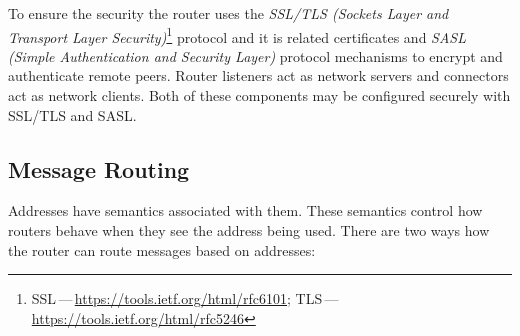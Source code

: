 
To ensure the security the router uses the \emph{SSL/TLS (Sockets Layer and Transport Layer Security)}\footnote{SSL\,---\,\url{https://tools.ietf.org/html/rfc6101}; TLS\,---\,\url{https://tools.ietf.org/html/rfc5246}} protocol and it is related certificates and \emph{SASL (Simple Authentication and Security Layer)}\footnotemark{} protocol mechanisms to encrypt and authenticate remote peers. Router listeners act as network servers and connectors act as network clients. Both of these components may be configured securely with SSL/TLS and SASL.



\subsection{Message Routing}
\label{Message Routing}
Addresses have semantics associated with them. These semantics control how routers behave when they see the address being used. There are two ways how the router can route messages based on addresses:

